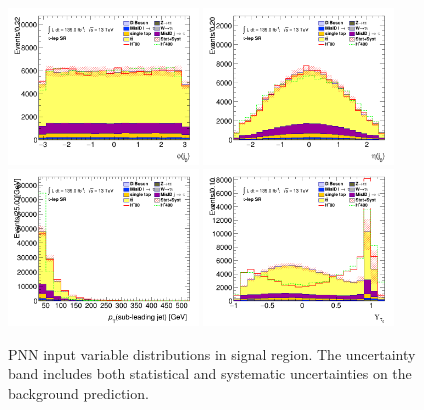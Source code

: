		\begin{figure}[!htp]
			\begin{center}    
			\includegraphics[width=0.45\textwidth]{chapters/chapter6_HPlus/images/taulep/jet_0_phi_SR_TAULEP.png}
			\includegraphics[width=0.45\textwidth]{chapters/chapter6_HPlus/images/taulep/jet_0_eta_SR_TAULEP.png} \\
			\includegraphics[width=0.45\textwidth]{chapters/chapter6_HPlus/images/taulep/jet_1_pt_SR_TAULEP.png}
			\includegraphics[width=0.45\textwidth]{chapters/chapter6_HPlus/images/taulep/tau_0_upsilon_SR_TAULEP.png} \\
			\end{center}
			\caption{
			PNN input variable distributions in \taulep signal region. The uncertainty band includes both statistical and systematic uncertainties on the background prediction. 
			}
			\label{fig:sr-taulep-4}
		\end{figure}